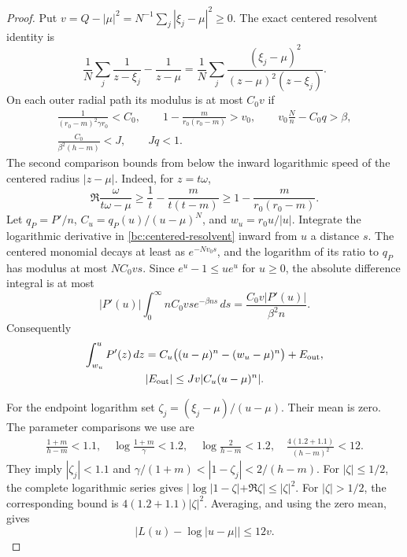 \begin{proof}
Put $v=Q-|\mu|^2=N^{-1}\sum_j|\xi_j-\mu|^2\geq0$.
The exact centered resolvent identity is
\begin{equation}\label{bc:centered-resolvent}
 \frac1N\sum_j\frac1{z-\xi_j}-\frac1{z-\mu}
 =\frac1N\sum_j
 \frac{(\xi_j-\mu)^2}{(z-\mu)^2(z-\xi_j)}.
\end{equation}
On each outer radial path its modulus is at most $C_0v$ if
\begin{equation}\label{bc:outer-gates}
\begin{gathered}
 \frac1{(r_0-m)^2\gamma r_0}<C_0,\qquad
 1-\frac{m}{r_0(r_0-m)}>v_0,\qquad
 v_0\frac Nn-C_0q>\beta,\\
 \frac{C_0}{\beta^2(h-m)}<J,\qquad Jq<1.
\end{gathered}
\end{equation}
The second comparison bounds from below the inward logarithmic speed
of the centered radius $|z-\mu|$.  Indeed, for $z=t\omega$,
\[
 \Re\frac\omega{t\omega-\mu}
 \geq\frac1t-\frac{m}{t(t-m)}
 \geq1-\frac{m}{r_0(r_0-m)}.
\]
Let $q_P=P'/n$, $C_u=q_P(u)/(u-\mu)^N$, and
$w_u=r_0u/|u|$.  Integrate the logarithmic derivative in
\eqref{bc:centered-resolvent} inward from $u$ a distance $s$.
The centered monomial decays at least as $e^{-Nv_0s}$, and the
logarithm of its ratio to $q_P$ has modulus at most
$NC_0vs$.  Since $e^u-1\leq ue^u$ for $u\geq0$, the
absolute difference integral is at most
\[
 |P'(u)|\int_0^\infty nC_0vs e^{-\beta ns}\,ds
 =\frac{C_0v|P'(u)|}{\beta^2n}.
\]
Consequently
\begin{equation}\label{bc:outer-primitive}
\begin{gathered}
 \int_{w_u}^uP'(z)\,dz
 =C_u\bigl((u-\mu)^n-(w_u-\mu)^n\bigr)+E_{\rm out},\\
 |E_{\rm out}|\leq Jv|C_u(u-\mu)^n|.
\end{gathered}
\end{equation}

For the endpoint logarithm set $\zeta_j=(\xi_j-\mu)/(u-\mu)$.
Their mean is zero.  The parameter comparisons we use are
\begin{equation}\label{bc:endpoint-log-gates}
\begin{gathered}
 \frac{1+m}{h-m}<1.1,\quad
 \log\frac{1+m}{\gamma}<1.2,\quad
 \log\frac2{h-m}<1.2,\quad
 \frac{4(1.2+1.1)}{(h-m)^2}<12.
\end{gathered}
\end{equation}
They imply $|\zeta_j|<1.1$ and
$\gamma/(1+m)<|1-\zeta_j|<2/(h-m)$.
For $|\zeta|\leq1/2$, the complete logarithmic series gives
$|\log|1-\zeta|+\Re\zeta|\leq|\zeta|^2$.
For $|\zeta|>1/2$, the corresponding bound is
$4(1.2+1.1)|\zeta|^2$.  Averaging, and using the zero mean,
gives
\begin{equation}\label{bc:centered-log}
 |L(u)-\log|u-\mu||\leq12v.
\end{equation}


\end{proof}
